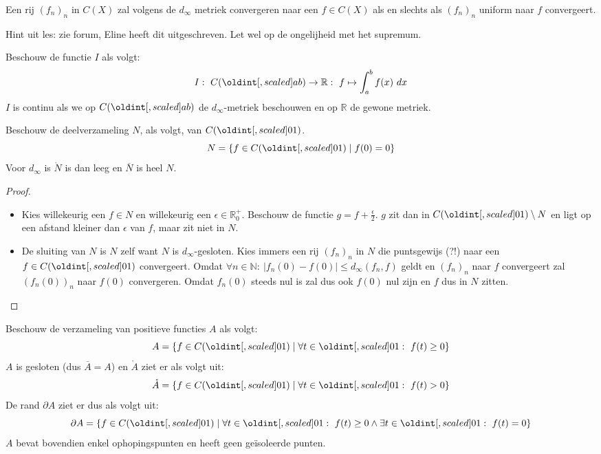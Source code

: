 \documentclass[main.tex]{subfiles}
\begin{document}
\begin{st}
  Een rij $(f_{n})_{n}$ in $C(X)$ zal volgens de $d_{\infty}$ metriek convergeren naar een $f\in C(X)$ als en slechts als $(f_{n})_{n}$ uniform naar $f$ convergeert.

Hint uit les: zie forum, Eline heeft dit uitgeschreven.
Let wel op de ongelijheid met het supremum.
\end{st}

\begin{vb}
  Beschouw de functie $I$ als volgt:
  \[ I:\ C(\interval{a}{b}) \rightarrow \mathbb{R}:\ f \mapsto \int_{a}^{b}f(x)\ dx \]
  $I$ is continu als we op $C(\interval{a}{b})$ de $d_{\infty}$-metriek beschouwen en op $\mathbb{R}$ de gewone metriek.
\end{vb}

\begin{vb}
  Beschouw de deelverzameling $N$, als volgt, van $C(\interval{0}{1})$.
  \[ N = \{ f \in C(\interval{0}{1}) \mid f(0) = 0 \} \]
  Voor $d_{\infty}$ is $\mathring{N}$ is dan leeg en $\overline{N}$ is heel $N$.

  \begin{proof}
    \noindent
    \begin{itemize}
    \item Kies willekeurig een $f\in N$ en willekeurig een $\epsilon \in \mathbb{R}_{0}^{+}$.
      Beschouw de functie $g=f+\frac{\epsilon}{2}$.
      $g$ zit dan in $C(\interval{0}{1})\setminus N$ en ligt op een afstand kleiner dan $\epsilon$ van $f$, maar zit niet in $N$.
    \item De sluiting van $N$ is $N$ zelf want $N$ is $d_{\infty}$-gesloten.
      Kies immers een rij $(f_{n})_{n}$ in $N$ die puntsgewijs (?!) naar een $f\in C(\interval{0}{1})$ convergeert.
      Omdat $\forall n\in \mathbb{N}:\ |f_{n}(0)-f(0)| \le d_{\infty}(f_{n},f)$ geldt en $(f_{n})_{n}$ naar $f$ convergeert zal $(f_{n}(0))_{n}$ naar $f(0)$ convergeren.
      Omdat $f_{n}(0)$ steeds nul is zal dus ook $f(0)$ nul zijn en $f$ dus in $N$ zitten.
    \end{itemize}
  \end{proof}
\end{vb}

\begin{vb}
  Beschouw de verzameling van positieve functies $A$ als volgt:
  \[ A = \{ f \in C(\interval{0}{1}) \mid \forall t\in \interval{0}{1}:\ f(t) \ge 0 \} \]
  $A$ is gesloten (dus $\overline{A}=A$) en $\mathring{A}$ ziet er als volgt uit:
  \[ \mathring{A} = \{ f \in C(\interval{0}{1}) \mid \forall t\in \interval{0}{1}:\ f(t) > 0 \} \]
  De rand $\partial A$ ziet er dus als volgt uit:
  \[ \partial A = \{ f \in C(\interval{0}{1}) \mid \forall t\in \interval{0}{1}:\ f(t) \ge 0 \wedge \exists t \in \interval{0}{1}:\ f(t) = 0 \} \]
  $A$ bevat bovendien enkel ophopingspunten en heeft geen ge\"isoleerde punten.

\end{vb}
\end{document}
